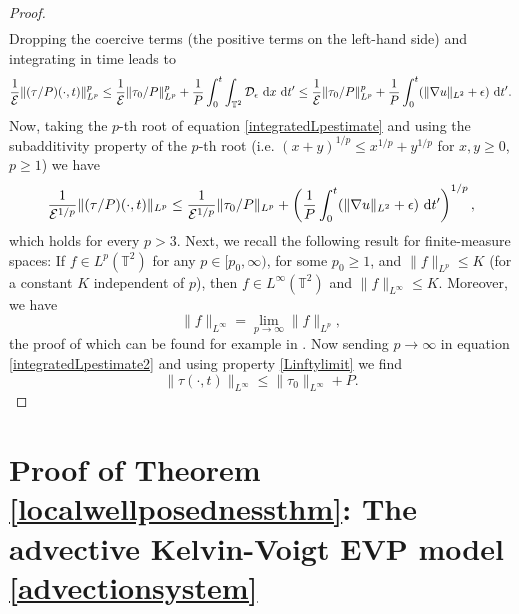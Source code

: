 \documentclass[12pt,a4paper]{article}
\theoremstyle{definition}
\theoremstyle{remark}
\numberwithin{equation}{section}
\newcommand{\dx}{\ {\rm d} {x}}
\newcommand{\dt}{\ {\rm d} t }
\begin{document}
\begin{proof}
\begin{align*}
\end{align*}
Dropping the coercive terms (the positive terms on the left-hand side) and integrating in time leads to
\begin{align}
\dfrac{1}{\mathcal E} \lVert (\tau / P) (\cdot, t) \rVert_{L^p}^p \leq \dfrac{1}{\mathcal E} \lVert \tau_0 / P \rVert_{L^p}^p + \frac{1}{P} \int_0^t \int_{\mathbb{T}^2} \mathcal{D}_\epsilon \dx \dt' \leq \dfrac{1}{\mathcal E} \lVert \tau_0 / P \rVert_{L^p}^p + \frac{1}{P} \int_0^t (\lVert \nabla u \rVert_{L^2} + \epsilon) \dt' \label{integratedLpestimate}.
\end{align}
Now, taking the $p$-th root of equation \eqref{integratedLpestimate} and using the subadditivity property of the $p$-th root (i.e. $(x + y)^{1/p} \leq x^{1/p} + y^{1/p}$ for $x,y \geq 0$, $ p \geq 1 $) we have
\begin{equation} \label{integratedLpestimate2}
\dfrac{1}{\mathcal{E}^{1/p}} \lVert (\tau / P) (\cdot, t) \rVert_{L^p} \leq \dfrac{1}{\mathcal{E}^{1/p}} \lVert \tau_0 / P \rVert_{L^p} + \left( \frac{1}{P} \int_0^t (\lVert \nabla u \rVert_{L^2} + \epsilon) \dt' \right)^{1/p},
\end{equation}
which holds for every $p > 3$. Next, we recall the following result for finite-measure spaces: If $f \in L^p (\mathbb{T}^2)$ for any $p \in [p_0,\infty)$, for some $p_0 \geq 1$, and $\lVert f \rVert_{L^p} \leq K$ (for a constant $K$ independent of $p$), then $f \in L^\infty (\mathbb{T}^2)$ and $\lVert f \rVert_{L^\infty} \leq K$. Moreover, we have
\begin{equation} \label{Linftylimit}
\lVert f \rVert_{L^\infty} = \lim_{p \rightarrow \infty} \lVert f \rVert_{L^p},
\end{equation}
the proof of which can be found for example in \cite[Theorem 2.8]{adams}. 
Now sending $p \rightarrow \infty$ in equation \eqref{integratedLpestimate2} and using property \eqref{Linftylimit} we find
\begin{equation}
\lVert \tau (\cdot, t) \rVert_{L^\infty} \leq \lVert \tau_0 \rVert_{L^\infty} + P.
\end{equation}
\end{proof}
\section{Proof of Theorem \ref{localwellposednessthm}: The advective Kelvin-Voigt EVP model \eqref{advectionsystem}}
\end{document}
